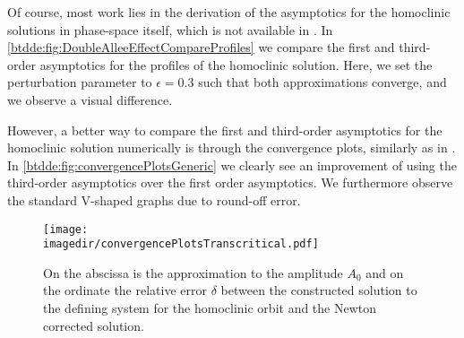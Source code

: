 Of course, most work lies in the derivation of the asymptotics for the
homoclinic solutions in phase-space itself, which is not available in
\cite{Jiao2021}. In \cref{btdde:fig:DoubleAlleeEffectCompareProfiles} we compare the
first and third-order asymptotics for the profiles of the homoclinic solution.
Here, we set the perturbation parameter to $\epsilon=0.3$ such that both
approximations converge, and we observe a visual difference.

However, a better way to compare the first and third-order
asymptotics for the homoclinic solution numerically is through the convergence
plots, similarly as in \cite{Bosschaert@Interplay}. In
\cref{btdde:fig:convergencePlotsGeneric} we clearly see an improvement of using the
third-order asymptotics over the first order asymptotics. We furthermore
observe the standard V-shaped graphs due to round-off error.
\begin{figure}[ht]
    \texttt{[image: \\imagedir/convergencePlotsTranscritical.pdf]}
    \caption{On the abscissa is the approximation to the amplitude $A_0$ and on
        the ordinate the relative error $\delta$ between the constructed solution
        to the defining system for the homoclinic orbit
        and the Newton corrected solution.}
    \label{btdde:fig:convergencePlotsTranscritical}
\end{figure}

